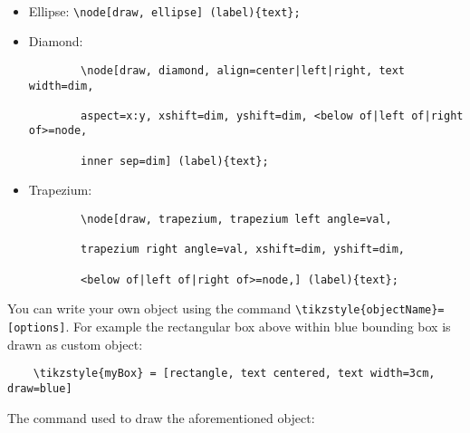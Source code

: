 \documentclass{article}
\begin{document}
\\

\begin{itemize}
    \item Ellipse: \verb|\node[draw, ellipse] (label){text};|
    \item Diamond: 
    \begin{verbatim}
        \node[draw, diamond, align=center|left|right, text width=dim,
        
        aspect=x:y, xshift=dim, yshift=dim, <below of|left of|right of>=node,
        
        inner sep=dim] (label){text};
    \end{verbatim}
    \item Trapezium:
    \begin{verbatim}
        \node[draw, trapezium, trapezium left angle=val,
        
        trapezium right angle=val, xshift=dim, yshift=dim,
        
        <below of|left of|right of>=node,] (label){text};
    \end{verbatim}
\end{itemize}

You can write your own object using the command \verb|\tikzstyle{objectName}=[options]|. For example the rectangular box above within blue bounding box is drawn as custom object:

\begin{verbatim}
    \tikzstyle{myBox} = [rectangle, text centered, text width=3cm, draw=blue]
\end{verbatim}

The command used to draw the aforementioned object:
\end{document}

